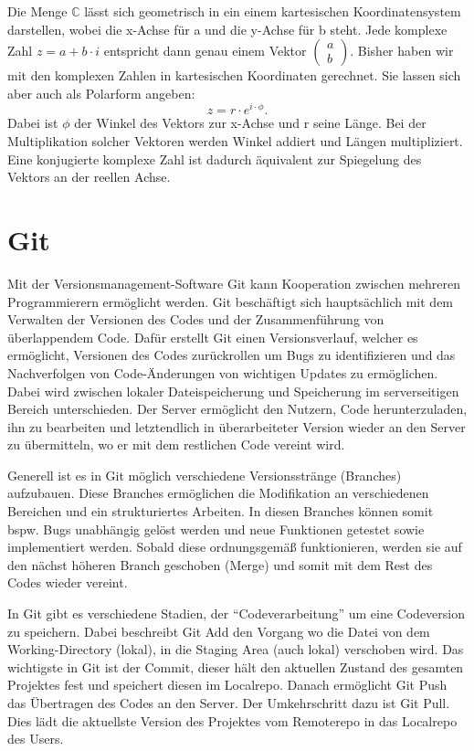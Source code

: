\documentclass[]{dsadokumentation}
\begin{document}
Die Menge $\mathbb{C}$ lässt sich geometrisch in ein einem kartesischen Koordinatensystem darstellen, wobei die x-Achse für a und die y-Achse für b steht. Jede komplexe Zahl $z=a+b\cdot i$ entspricht dann genau einem Vektor $\begin{pmatrix} a\\b
\end{pmatrix}$.
Bisher haben wir mit den komplexen Zahlen in kartesischen Koordinaten gerechnet. Sie lassen sich aber auch als Polarform angeben:
\begin{displaymath}
z=r\cdot e^{i\cdot\phi}.
\end{displaymath}
Dabei ist $\phi$ der Winkel des Vektors zur x-Achse und r seine Länge. Bei der Multiplikation solcher Vektoren werden Winkel addiert und Längen multipliziert. Eine konjugierte komplexe Zahl ist dadurch äquivalent zur Spiegelung des Vektors an der reellen Achse.

\section{Git}
Mit der Versionsmanagement-Software Git kann Kooperation zwischen mehreren Programmierern ermöglicht werden. Git beschäftigt sich hauptsächlich mit dem Verwalten der Versionen des Codes und der Zusammenführung von überlappendem Code. Dafür erstellt Git einen Versionsverlauf, welcher es ermöglicht, Versionen des Codes zurückrollen um Bugs zu identifizieren und das Nachverfolgen von Code-Änderungen von wichtigen Updates zu ermöglichen. Dabei wird zwischen lokaler Dateispeicherung und Speicherung im serverseitigen Bereich unterschieden. Der Server ermöglicht den Nutzern, Code herunterzuladen, ihn zu bearbeiten und letztendlich in überarbeiteter Version wieder an den Server zu übermitteln, wo er mit dem restlichen Code vereint wird.

Generell ist es in Git möglich verschiedene Versionsstränge (Branches) aufzubauen. Diese Branches ermöglichen die Modifikation an verschiedenen Bereichen und ein strukturiertes Arbeiten. In diesen Branches können somit bspw. Bugs unabhängig gelöst werden und neue Funktionen getestet sowie implementiert werden. Sobald diese ordnungsgemäß funktionieren, werden sie auf den nächst höheren Branch geschoben (Merge) und somit mit dem Rest des Codes wieder vereint.

In Git gibt es verschiedene Stadien, der \enquote{Codeverarbeitung} um eine Codeversion zu speichern. Dabei beschreibt Git Add den Vorgang wo die Datei von dem Working-Directory (lokal), in die Staging Area (auch lokal) verschoben wird. Das wichtigste in Git ist der Commit, dieser hält den aktuellen Zustand des gesamten Projektes fest und speichert diesen im Localrepo. Danach ermöglicht Git Push das Übertragen des Codes an den Server. Der Umkehrschritt dazu ist Git Pull. Dies lädt die aktuellste Version des Projektes vom Remoterepo in das Localrepo des Users.
\end{document}
